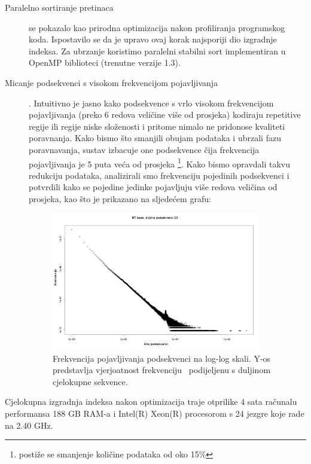 \documentclass[times, utf8, diplomski]{fer}
\begin{document}
\begin{description}
\item [Paralelno sortiranje pretinaca] se pokazalo kao prirodna optimizacija nakon profiliranja programskog koda.
Ispostavilo se da je upravo ovaj korak najsporiji dio izgradnje indeksa. Za ubrzanje koristimo paralelni stabilni
sort implementiran u OpenMP biblioteci (trenutne verzije 1.3).
\item [Micanje podsekvenci s visokom frekvencijom pojavljivanja]. Intuitivno je jasno kako podsekvence s vrlo visokom frekvencijom pojavljivanja (preko 6 redova veličine više od prosjeka) kodiraju repetitive regije ili 
regije niske složenosti i pritome nimalo ne pridonose kvaliteti poravnanja. Kako bismo što smanjili obujam podataka
i ubrzali fazu poravnavanja, sustav izbacuje one podsekvence čija frekvencija pojavljivanja je 5 puta veća od
prosjeka \footnote{postiže se smanjenje količine podataka od oko 15\%}. Kako bismo opravdali takvu redukciju
podataka, analizirali smo frekvenciju pojedinih podsekvenci i potvrdili kako se pojedine jedinke pojavljuju više
redova veličina od prosjeka, kao što je prikazano na sljedećem grafu:

\begin{figure}[!ht]
\begin{center}
	\includegraphics[width=0.9\textwidth]{../img/kmers_20.png}
	\caption{Frekvencija pojavljivanja podsekvenci na log-log skali. Y-os predstavlja vjerjoatnost frekvenciju \
podijeljenu s duljinom cjelokupne sekvence.}
\end{center}
\end{figure}

\end{description}

Cjelokupna izgradnja indeksa nakon optimizacija traje otprilike 4 sata računalu performansa 188 GB RAM-a i Intel(R) Xeon(R) procesorom s 24 jezgre koje rade na 2.40 GHz.
\end{document}

